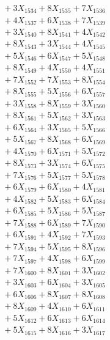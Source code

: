 \documentclass[a4paper,10pt]{article}
\begin{document}
{\begin{align}
&\;  + 3 X_{1534} + 8 X_{1535} + 7 X_{1536} \\[0.3ex]
&\;  + 4 X_{1537} + 6 X_{1538} + 7 X_{1539} \\[0.5ex]\allowbreak
&\;  + 3 X_{1540} + 8 X_{1541} + 4 X_{1542} \\[0.3ex]
&\;  + 8 X_{1543} + 3 X_{1544} + 4 X_{1545} \\[0.3ex]
&\;  + 5 X_{1546} + 6 X_{1547} + 5 X_{1548} \\[0.3ex]
&\;  + 8 X_{1549} + 4 X_{1550} + 4 X_{1551} \\[0.3ex]
&\;  + 7 X_{1552} + 7 X_{1553} + 8 X_{1554} \\[0.3ex]
&\;  + 8 X_{1555} + 5 X_{1556} + 6 X_{1557} \\[0.3ex]
&\;  + 3 X_{1558} + 8 X_{1559} + 3 X_{1560} \\[0.3ex]
&\;  + 8 X_{1561} + 5 X_{1562} + 3 X_{1563} \\[0.3ex]
&\;  + 6 X_{1564} + 3 X_{1565} + 5 X_{1566} \\[0.3ex]
&\;  + 5 X_{1567} + 8 X_{1568} + 6 X_{1569} \\[0.5ex]\allowbreak
&\;  + 4 X_{1570} + 6 X_{1571} + 5 X_{1572} \\[0.3ex]
&\;  + 8 X_{1573} + 3 X_{1574} + 6 X_{1575} \\[0.3ex]
&\;  + 7 X_{1576} + 5 X_{1577} + 5 X_{1578} \\[0.3ex]
&\;  + 6 X_{1579} + 6 X_{1580} + 4 X_{1581} \\[0.3ex]
&\;  + 4 X_{1582} + 5 X_{1583} + 6 X_{1584} \\[0.3ex]
&\;  + 6 X_{1585} + 5 X_{1586} + 5 X_{1587} \\[0.3ex]
&\;  + 7 X_{1588} + 6 X_{1589} + 7 X_{1590} \\[0.3ex]
&\;  + 6 X_{1591} + 4 X_{1592} + 7 X_{1593} \\[0.3ex]
&\;  + 7 X_{1594} + 5 X_{1595} + 8 X_{1596} \\[0.3ex]
&\;  + 7 X_{1597} + 4 X_{1598} + 6 X_{1599} \\[0.5ex]\allowbreak
&\;  + 7 X_{1600} + 8 X_{1601} + 3 X_{1602} \\[0.3ex]
&\;  + 3 X_{1603} + 6 X_{1604} + 3 X_{1605} \\[0.3ex]
&\;  + 6 X_{1606} + 8 X_{1607} + 8 X_{1608} \\[0.3ex]
&\;  + 8 X_{1609} + 4 X_{1610} + 6 X_{1611} \\[0.3ex]
&\;  + 5 X_{1612} + 6 X_{1613} + 6 X_{1614} \\[0.3ex]
&\;  + 5 X_{1615} + 8 X_{1616} + 3 X_{1617} \\[0.3ex]

\end{align}}
\end{document}

